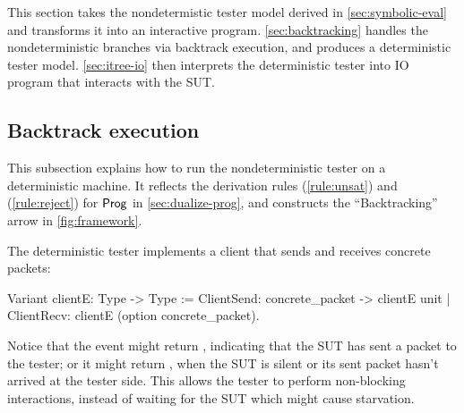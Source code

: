 This section takes the nondetermistic tester model derived in
\autoref{sec:symbolic-eval} and transforms it into an interactive program.
\autoref{sec:backtracking} handles the nondeterministic branches via backtrack
execution, and produces a deterministic tester model.  \autoref{sec:itree-io}
then interprets the deterministic tester into IO program that interacts with the
SUT.

\subsection{Backtrack execution}
\label{sec:backtracking}
This subsection explains how to run the nondeterministic tester on a
deterministic machine.  It reflects the derivation rules (\ref{rule:unsat}) and
(\ref{rule:reject}) for $\mathsf{Prog}$ in \autoref{sec:dualize-prog}, and constructs
the ``Backtracking'' arrow in \autoref{fig:framework}.

The deterministic tester implements a client that sends and receives concrete
packets:
\begin{coq}
  Variant clientE: Type -> Type :=
    ClientSend: concrete_packet -> clientE unit
  | ClientRecv: clientE (option concrete_packet).
\end{coq}

Notice that the  event might return , indicating
that the SUT has sent a packet  to the tester; or it might
return , when the SUT is silent or its sent packet hasn't arrived at
the tester side.  This allows the tester to perform non-blocking interactions,
instead of waiting for the SUT which might cause starvation.

